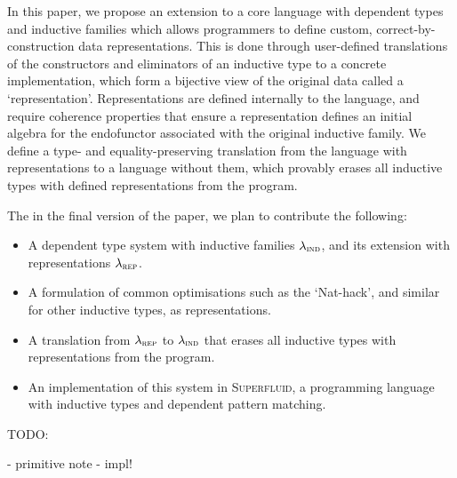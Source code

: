 In this paper, we propose an extension to a core language with dependent types
and inductive families which allows programmers to define custom,
correct-by-construction data representations. This is done
through user-defined translations of the constructors and eliminators of an
inductive type to a concrete implementation, which form a bijective view of the
original data called a `representation'. Representations are defined internally
to the language, and require coherence properties that ensure a representation
defines an initial algebra for the endofunctor associated with the original
inductive family. We define a type- and equality-preserving translation from the
language with representations to a language without them, which provably erases
all inductive types with defined representations from the program.

The in the final version of the paper, we plan to contribute the following:
\begin{itemize}
  \item A dependent type system with inductive families $\lambda_{\textsc{ind}}$,
    and its extension with representations $\lambda_{\textsc{rep}}$.
  \item A formulation of common optimisations such as the `Nat-hack', and
      similar for other inductive types, as representations.
  \item A translation from $\lambda_{\textsc{rep}}$ to $\lambda_{\textsc{ind}}$ that erases all
    inductive types with representations from the program.
  \item An implementation of this system in \textsc{Superfluid}, a programming
    language with inductive types and dependent pattern matching.
\end{itemize}


TODO:

- primitive note
- impl!
